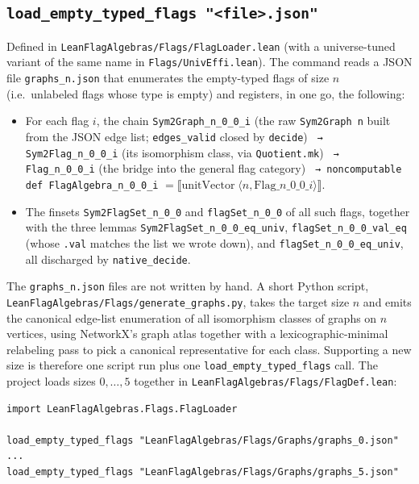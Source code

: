 \documentclass[11pt]{article}
\begin{document}
\subsection{\texttt{load\_empty\_typed\_flags "<file>.json"}}

Defined in \texttt{LeanFlagAlgebras/Flags/FlagLoader.lean} (with a
universe-tuned variant of the same name in
\texttt{Flags/UnivEffi.lean}). The command reads a JSON file
\texttt{graphs\_n.json} that enumerates the empty-typed flags of size
$n$ (i.e.\ unlabeled flags whose type is empty) and registers, in one
go, the following:

\begin{itemize}
  \item For each flag $i$, the chain
    \texttt{Sym2Graph\_n\_0\_0\_i} (the raw \texttt{Sym2Graph n} built
    from the JSON edge list; \texttt{edges\_valid} closed by
    \texttt{decide})
    \texttt{ → Sym2Flag\_n\_0\_0\_i} (its isomorphism class, via
    \texttt{Quotient.mk})
    \texttt{ → Flag\_n\_0\_0\_i} (the bridge into the general flag
    category)
    \texttt{ → noncomputable def FlagAlgebra\_n\_0\_0\_i}
    $= \llbracket \mathrm{unitVector}\;\langle n,\mathrm{Flag}\_n\_0\_0\_i\rangle\rrbracket$.
  \item The finsets \texttt{Sym2FlagSet\_n\_0\_0} and
    \texttt{flagSet\_n\_0\_0} of all such flags, together with the
    three lemmas
    \texttt{Sym2FlagSet\_n\_0\_0\_eq\_univ},
    \texttt{flagSet\_n\_0\_0\_val\_eq} (whose \texttt{.val} matches
    the list we wrote down), and
    \texttt{flagSet\_n\_0\_0\_eq\_univ}, all discharged by
    \texttt{native\_decide}.
\end{itemize}

The \texttt{graphs\_n.json} files are not written by hand. A short
Python script, \texttt{LeanFlagAlgebras/Flags/generate\_graphs.py},
takes the target size $n$ and emits the canonical edge-list
enumeration of all isomorphism classes of graphs on $n$ vertices,
using NetworkX's graph atlas together with a lexicographic-minimal
relabeling pass to pick a canonical representative for each class.
Supporting a new size is therefore one script run plus one
\texttt{load\_empty\_typed\_flags} call. The project loads sizes
$0,\ldots,5$ together in \texttt{LeanFlagAlgebras/Flags/FlagDef.lean}:

\begin{lstlisting}
import LeanFlagAlgebras.Flags.FlagLoader

load_empty_typed_flags "LeanFlagAlgebras/Flags/Graphs/graphs_0.json"
...
load_empty_typed_flags "LeanFlagAlgebras/Flags/Graphs/graphs_5.json"
\end{lstlisting}
\end{document}
